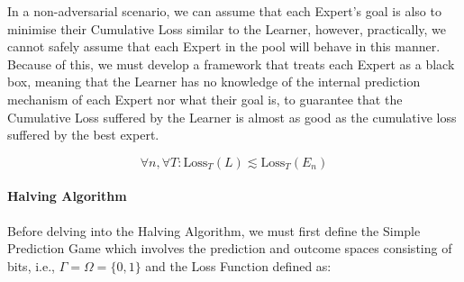In a non-adversarial scenario, we can assume that each Expert's goal is also to minimise their Cumulative Loss similar to the Learner, however, practically, we cannot safely assume that each Expert in the pool will behave in this manner. Because of this, we must develop a framework that treats each Expert as a black box, meaning that the Learner has no knowledge of the internal prediction mechanism of each Expert nor what their goal is, to guarantee that the Cumulative Loss suffered by the Learner is almost as good as the cumulative loss suffered by the best expert.

\begin{equation}
    \forall n, \forall T: \text{Loss}_T(L) \lesssim \text{Loss}_T(E_n)
\end{equation}




\paragraph{Halving Algorithm}\label{paragraph:halving_algorithm}
Before delving into the Halving Algorithm, we must first define the Simple Prediction Game which involves the prediction and outcome spaces consisting of bits, i.e., $\Gamma = \Omega = \{0, 1\}$ and the Loss Function defined as:

